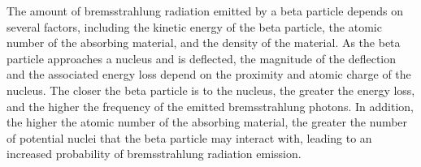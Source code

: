 		The amount of bremsstrahlung radiation emitted by a beta particle depends on several factors, including the kinetic energy of the beta particle, the atomic number of the absorbing material, and the density of the material. As the beta particle approaches a nucleus and is deflected, the magnitude of the deflection and the associated energy loss depend on the proximity and atomic charge of the nucleus. The closer the beta particle is to the nucleus, the greater the energy loss, and the higher the frequency of the emitted bremsstrahlung photons. In addition, the higher the atomic number of the absorbing material, the greater the number of potential nuclei that the beta particle may interact with, leading to an increased probability of bremsstrahlung radiation emission.